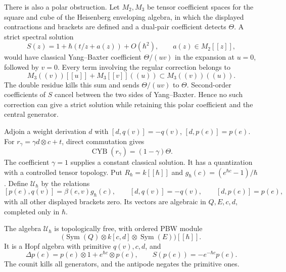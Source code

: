 There is also a polar obstruction. Let \(M_2,M_3\) be tensor
coefficient spaces for the square and cube of the Heisenberg
enveloping algebra, in which the displayed contractions and brackets
are defined and a dual-pair coefficient detects \(\Theta\).
A strict spectral solution
\[
 S(z)=1+\hbar(t/z+a(z))+O(\hbar^2),\qquad a(z)\in M_2[[z]],
\]
would have classical Yang--Baxter coefficient \(\Theta/(uv)\)
in the expansion at \(u=0\), followed by \(v=0\).
Every term involving the regular correction belongs to
\[
 M_3((v))[[u]]+M_3[[v]]((u))
       \subset M_3((v))((u)).
\]
The double residue kills this sum and sends
\(\Theta/(uv)\) to \(\Theta\).
Second-order coefficients of \(S\) cancel between the two sides
of Yang--Baxter. Hence no such correction can give a strict
solution while retaining this polar coefficient and the central
generator.

Adjoin a weight derivation \(d\) with
\([d,q(v)]=-q(v)\), \([d,p(e)]=p(e)\).
For \(r_\gamma=\gamma d\otimes c+t\), direct commutation gives
\[
 \operatorname{CYB}(r_\gamma)=(1-\gamma)\Theta.
\]
The coefficient \(\gamma=1\) supplies a constant classical solution.
It has a quantization with a controlled tensor topology.
Put \(R_\hbar=k[[\hbar]]\) and
\(g_\hbar(c)=(e^{\hbar c}-1)/\hbar\).
Define \(\mathcal U_\hbar\) by the relations
\begin{equation}\label{cyrep:eq:oscillator-relations}
 [p(e),q(v)]=\beta(e,v)g_\hbar(c),\qquad
 [d,q(v)]=-q(v),\qquad[d,p(e)]=p(e),
\end{equation}
with all other displayed brackets zero.
Its vectors are algebraic in \(Q,E,c,d\), completed only
in \(\hbar\).

\begin{theorem}\label{cyrep:thm:oscillator-hopf}
The algebra \(\mathcal U_\hbar\) is topologically free, with
ordered PBW module
\[
 \bigl(\operatorname{Sym}(Q)\otimes k[c,d]
                         \otimes\operatorname{Sym}(E)\bigr)[[\hbar]].
\]
It is a Hopf algebra with primitive \(q(v),c,d\), and
\begin{equation}\label{cyrep:eq:oscillator-coproduct}
 \Delta p(e)=p(e)\otimes1+e^{\hbar c}\otimes p(e),\qquad
 S(p(e))=-e^{-\hbar c}p(e).
\end{equation}
The counit kills all generators, and the antipode negates
the primitive ones.
\end{theorem}

